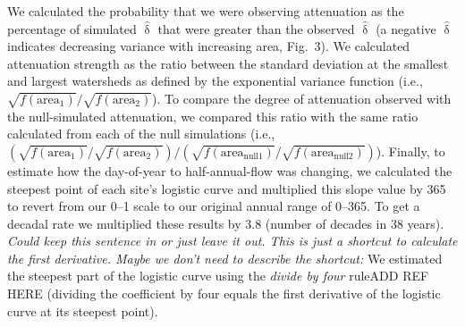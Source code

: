 \documentclass[12pt]{article}
\title{}
\author{}
\date{}
\begin{document}
\maketitle
We calculated the probability that we were observing attenuation as the percentage of simulated $\hat{\updelta}$ that were greater than the observed $\hat{\updelta}$ (a negative $\hat{\updelta}$ indicates decreasing variance with increasing area, Fig.~3). We calculated attenuation strength as the ratio between the standard deviation at the smallest and largest  watersheds as defined by the exponential variance function  (i.e.,\ $\sqrt{f(\mathrm{area}_1)} / \sqrt{f(\mathrm{area}_2)}$). To compare the degree of attenuation observed with the null-simulated attenuation, we compared this ratio with the same ratio calculated from each of the null simulations (i.e.,\ $\left( \sqrt{f(\mathrm{area}_1)} / \sqrt{f(\mathrm{area}_2)} \right) / \left( \sqrt{f(\mathrm{area}_{\mathrm{null} 1})} / \sqrt{f(\mathrm{area}_{\mathrm{null} 2})} \right)$). Finally, to estimate how the day-of-year to half-annual-flow was changing, we calculated the steepest point of each site's logistic curve and multiplied this slope value by 365 to revert from our 0--1 scale to our original annual range of 0--365. To get a decadal rate we multiplied these results by 3.8 (number of decades in 38 years). 
\textit{
Could keep this sentence in or just leave it out. This is just a shortcut to calculate the first derivative. Maybe we don't need to describe the shortcut: 
}
We estimated the steepest part of the logistic curve using the \textit{divide by four} ruleADD REF HERE (dividing the coefficient by four equals the first derivative of the logistic curve at its steepest point).



\end{document}
